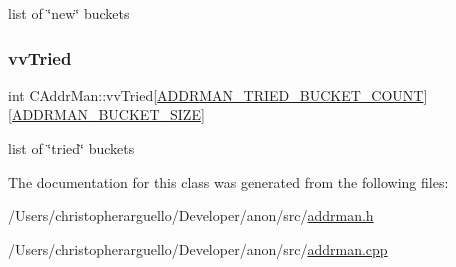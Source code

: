 list of \char`\"{}new\char`\"{} buckets 

\mbox{\label{class_c_addr_man_a3d0e798757be2620f76a5ee02d3b321e}} 
\subsubsection{\texorpdfstring{vv\+Tried}{vvTried}}
{\footnotesize\ttfamily int C\+Addr\+Man\+::vv\+Tried\mbox{[}\mbox{\hyperlink{addrman_8h_ab09df186aa818ce7b9e7c86446511cf1}{A\+D\+D\+R\+M\+A\+N\+\_\+\+T\+R\+I\+E\+D\+\_\+\+B\+U\+C\+K\+E\+T\+\_\+\+C\+O\+U\+NT}}\mbox{]}\mbox{[}\mbox{\hyperlink{addrman_8h_a3499731a6c89e164cf74b68be2be0a84}{A\+D\+D\+R\+M\+A\+N\+\_\+\+B\+U\+C\+K\+E\+T\+\_\+\+S\+I\+ZE}}\mbox{]}\hspace{0.3cm}{\ttfamily [private]}}



list of \char`\"{}tried\char`\"{} buckets 



The documentation for this class was generated from the following files\+:\begin{DoxyCompactItemize}
\item 
/\+Users/christopherarguello/\+Developer/anon/src/\mbox{\hyperlink{addrman_8h}{addrman.\+h}}\item 
/\+Users/christopherarguello/\+Developer/anon/src/\mbox{\hyperlink{addrman_8cpp}{addrman.\+cpp}}\end{DoxyCompactItemize}
